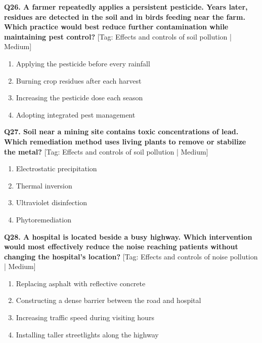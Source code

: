 \noindent\textbf{Q26. A farmer repeatedly applies a persistent pesticide. Years later, residues are detected in the soil and in birds feeding near the farm. Which practice would best reduce further contamination while maintaining pest control?} \hfill [Tag: Effects and controls of soil pollution | Medium]
\begin{enumerate}[label=(\alph*),topsep=2pt,itemsep=1pt,partopsep=0pt,parsep=0pt]
    \item {Applying the pesticide before every rainfall}
    \item {Burning crop residues after each harvest}
    \item {Increasing the pesticide dose each season}
    \item {Adopting integrated pest management}
\end{enumerate}
\vspace{2mm}

\noindent\textbf{Q27. Soil near a mining site contains toxic concentrations of lead. Which remediation method uses living plants to remove or stabilize the metal?} \hfill [Tag: Effects and controls of soil pollution | Medium]
\begin{enumerate}[label=(\alph*),topsep=2pt,itemsep=1pt,partopsep=0pt,parsep=0pt]
    \item {Electrostatic precipitation}
    \item {Thermal inversion}
    \item {Ultraviolet disinfection}
    \item {Phytoremediation}
\end{enumerate}
\vspace{2mm}

\noindent\textbf{Q28. A hospital is located beside a busy highway. Which intervention would most effectively reduce the noise reaching patients without changing the hospital's location?} \hfill [Tag: Effects and controls of noise pollution | Medium]
\begin{enumerate}[label=(\alph*),topsep=2pt,itemsep=1pt,partopsep=0pt,parsep=0pt]
    \item {Replacing asphalt with reflective concrete}
    \item {Constructing a dense barrier between the road and hospital}
    \item {Increasing traffic speed during visiting hours}
    \item {Installing taller streetlights along the highway}
\end{enumerate}
\vspace{2mm}

